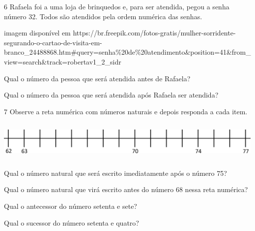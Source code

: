 \begin{escolha}
\num{6} Rafaela foi a uma loja de brinquedos e, para ser atendida, pegou a senha
número 32. Todos são atendidos pela ordem numérica das senhas.

\incluir imagem disponível em https://br.freepik.com/fotos-gratis/mulher-sorridente-segurando-o-cartao-de-visita-em-branco_24488868.htm#query=senha\%20de\%20atendimento\&position=41\&from_view=search\&track=robertav1_2_sidr

\begin{escolha}

\item
  Qual o número da pessoa que será atendida antes de Rafaela?

\item
  Qual o número da pessoa que será atendida após Rafaela ser atendida?

\end{escolha}

\num{7} Observe a reta numérica com números naturais e depois responda a cada item.


\includegraphics[width=5.22545in,height=0.75840in]{media/image31.png}

\begin{escolha}

\item
  Qual o número natural que será escrito imediatamente após o número 75?

\item
  Qual o número natural que virá escrito antes do número 68 nessa reta
  numérica?

\item
  Qual o antecessor do número setenta e sete?

\item
  Qual o sucessor do número setenta e quatro?

\end{escolha}


\end{escolha}

